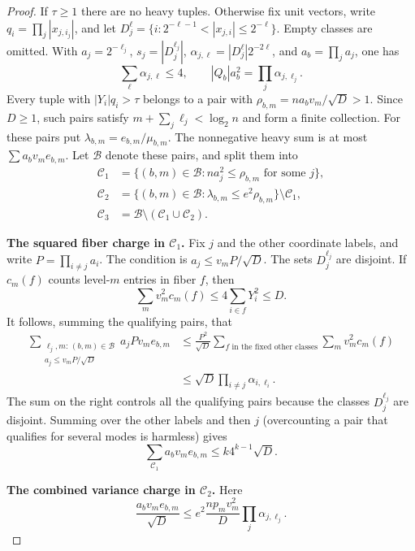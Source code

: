 \documentclass[11pt]{article}
\theoremstyle{spaced}
\theoremstyle{remark}
\numberwithin{equation}{section}
\newcommand{\step}[1]{\par\addvspace{0.5\baselineskip}\noindent\textbf{#1}\enspace}
\begin{document}
\begin{proof}
If $\tau\ge1$ there are no heavy tuples. Otherwise fix unit vectors,
write $q_i=\prod_j|x_{j,i_j}|$, and let
$D_j^\ell=\{i:2^{-\ell-1}<|x_{j,i}|\le2^{-\ell}\}$.
Empty classes are omitted. With $a_j=2^{-\ell_j}$, $s_j=|D_j^{\ell_j}|$,
$\alpha_{j,\ell}=|D_j^\ell|2^{-2\ell}$, and $a_b=\prod_ja_j$, one has
\[
 \sum_\ell\alpha_{j,\ell}\le4,
 \qquad |Q_b|a_b^2=\prod_j\alpha_{j,\ell_j}.
\]
Every tuple with $|Y_i|q_i>\tau$ belongs to a pair with
$\rho_{b,m}=na_bv_m/\sqrt D>1$. Since $D\ge1$, such pairs satisfy
$m+\sum_j\ell_j<\log_2n$ and form a finite collection.
For these pairs put $\lambda_{b,m}=e_{b,m}/\mu_{b,m}$.
The nonnegative heavy sum is at most $\sum a_bv_me_{b,m}$.
Let $\mathcal B$ denote these pairs, and split them into
\begin{align*}
 \mathcal C_1&=\{(b,m)\in\mathcal B:na_j^2\le\rho_{b,m}
                   \text{ for some }j\},\\
 \mathcal C_2&=\{(b,m)\in\mathcal B:\lambda_{b,m}\le e^2\rho_{b,m}\}
                   \setminus\mathcal C_1,\\
 \mathcal C_3&=\mathcal B\setminus(\mathcal C_1\cup\mathcal C_2).
\end{align*}
\step{The squared fiber charge in $\mathcal C_1$.}
Fix $j$ and the other coordinate labels, and write $P=\prod_{i\ne j}a_i$.
The condition is $a_j\le v_mP/\sqrt D$. The sets $D_j^{\ell_j}$ are
disjoint. If $c_m(f)$ counts level-$m$ entries in fiber $f$, then
\[
 \sum_m v_m^2c_m(f)\le4\sum_{i\in f}Y_i^2\le D.
\]
It follows, summing the qualifying pairs, that
\[
 \begin{aligned}
 \sum_{\substack{\ell_j,m:\,(b,m)\in\mathcal B\\
                 a_j\le v_mP/\sqrt D}}a_jPv_me_{b,m}
 &\le\frac{P^2}{\sqrt D}
       \sum_{f\text{ in the fixed other classes}}\sum_m v_m^2c_m(f)\\
 &\le\sqrt D\prod_{i\ne j}\alpha_{i,\ell_i}.
 \end{aligned}
\]
The sum on the right controls all the qualifying pairs because the
classes $D_j^{\ell_j}$ are disjoint. Summing over the other labels
and then $j$ (overcounting a pair that qualifies for several modes is
harmless) gives
\begin{equation}\label{eq:C1}
 \sum_{\mathcal C_1}a_bv_me_{b,m}\le k4^{k-1}\sqrt D.
\end{equation}
\step{The combined variance charge in $\mathcal C_2$.}
Here
\[
 \frac{a_bv_me_{b,m}}{\sqrt D}
 \le e^2\frac{np_mv_m^2}{D}\prod_j\alpha_{j,\ell_j}.
\]
\end{proof}
\end{document}
